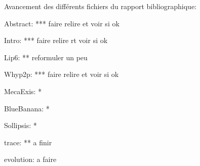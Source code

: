 Avancement des différents fichiers du rapport bibliographique:

Abstract: *** faire relire et voir si ok 

Intro: *** faire relire rt voir si ok

Lip6: ** reformuler un peu
 
Whyp2p: *** faire relire et voir si ok

MecaExis: *

BlueBanana: *

Sollipsis: *

trace: ** a finir

evolution: a faire
